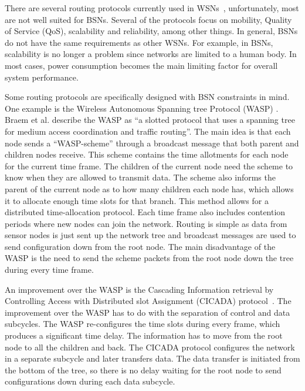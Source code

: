 There are several routing protocols currently used in WSNs~\cite{survey:wirelessrouting}, unfortunately, most are not well suited for BSNs. Several of the protocols focus on mobility, Quality of Service (QoS), scalability and reliability, among other things. In general, BSNs do not have the same requirements as other WSNs. For example, in BSNs, scalability is no longer a problem since networks are limited to a human body. In most cases, power consumption becomes the main limiting factor for overall system performance. 

Some routing protocols are specifically designed with BSN constraints in mind. One example is the Wireless Autonomous Spanning tree Protocol (WASP) \cite{protocol:WASP}. Braem et al. describe the WASP as ``a slotted protocol that uses a spanning tree for medium access coordination and traffic routing''. The main idea is that each node sends a ``WASP-scheme'' through a broadcast message that both parent and children nodes receive. This scheme contains the time allotments for each node for the current time frame. The children of the current node need the scheme to know when they are allowed to transmit data. The scheme also informs the parent of the current node as to how many children each node has, which allows it to allocate enough time slots for that branch. This method allows for a distributed time-allocation protocol. Each time frame also includes contention periods where new nodes can join the network. Routing is simple as data from sensor nodes is just sent up the network tree and broadcast messages are used to send configuration down from the root node. The main disadvantage of the WASP is the need to send the scheme packets from the root node down the tree during every time frame.

An improvement over the WASP is the Cascading Information retrieval by Controlling Access with Distributed slot Assignment (CICADA) protocol~\cite{protocol:CICADA}. The improvement over the WASP has to do with the separation of control and data subcycles. The WASP re-configures the time slots during every frame, which produces a significant time delay. The information has to move from the root node to all the children and back. The CICADA protocol configures the network in a separate subcycle and later transfers data. The data transfer is initiated from the bottom of the tree, so there is no delay waiting for the root node to send configurations down during each data subcycle.

